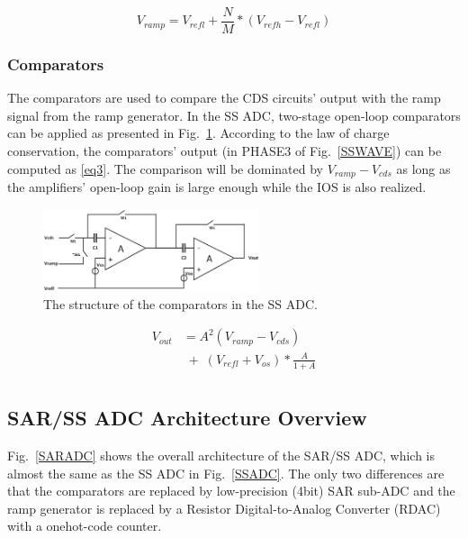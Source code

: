 \begin{equation}
	V_{ramp}=V_{refl}+\frac{N}{M}\ast\left(V_{refh}-V_{refl}\right)
	\label{eq2}
\end{equation}

\subsubsection{Comparators}

The comparators are used to compare the CDS circuits' output with the ramp signal from the ramp generator. 
In the SS ADC, two-stage open-loop comparators can be applied as presented in Fig.~\ref{COM}. According to the law of charge conservation, 
the comparators’ output (in PHASE3 of Fig.~\ref{SSWAVE}) can be computed as \eqref{eq3}. The comparison will be dominated by $V_{ramp}-V_{cds}$ as long as the amplifiers’ open-loop gain 
is large enough while the IOS is also realized.%

\begin{figure}[htbp]
	\centerline{\includegraphics[width=2.5in]{./Figures/COM.eps}}
	\caption{The structure of the comparators in the SS ADC.}
	\label{COM}
\end{figure} 

\begin{equation}
	\begin{aligned}
		V_{out}&=A^2(V_{ramp}-V_{cds})\\
		&\;{+}\;\left(V_{refl}+V_{os}\right)\ast\frac{A}{1+A}\\ 		
		\label{eq3}
	\end{aligned}
\end{equation}

\subsection{SAR/SS ADC Architecture Overview}

Fig.~\ref{SARADC} shows the overall architecture of the SAR/SS ADC, which is almost the same as the SS ADC in Fig.~\ref{SSADC}. The only two differences are that the comparators are replaced by low-precision (4bit) SAR sub-ADC and
the ramp generator is replaced by a Resistor Digital-to-Analog Converter (RDAC) with a onehot-code counter.

